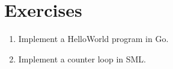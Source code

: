 \section{Exercises}

\begin{enumerate}

\item Implement a HelloWorld program in Go.

\item Implement a counter loop in SML.

\end{enumerate}
